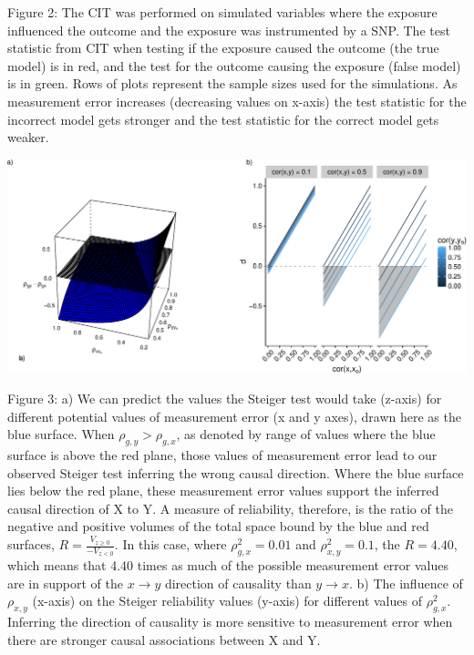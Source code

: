 \documentclass[]{article}
\begin{document}
Figure 2: The CIT was performed on simulated variables where the
exposure influenced the outcome and the exposure was instrumented by a
SNP. The test statistic from CIT when testing if the exposure caused the
outcome (the true model) is in red, and the test for the outcome causing
the exposure (false model) is in green. Rows of plots represent the
sample sizes used for the simulations. As measurement error increases
(decreasing values on x-axis) the test statistic for the incorrect model
gets stronger and the test statistic for the correct model gets weaker.

\newpage

\includegraphics{manuscript_files/figure-latex/steiger_sensitivity_plot-1.pdf}

Figure 3: a) We can predict the values the Steiger test would take
(z-axis) for different potential values of measurement error (x and y
axes), drawn here as the blue surface. When \(\rho_{g,y} > \rho_{g,x}\),
as denoted by range of values where the blue surface is above the red
plane, those values of measurement error lead to our observed Steiger
test inferring the wrong causal direction. Where the blue surface lies
below the red plane, these measurement error values support the inferred
causal direction of X to Y. A measure of reliability, therefore, is the
ratio of the negative and positive volumes of the total space bound by
the blue and red surfaces, \(R = \frac{V_{z \geq 0}}{ - V_{z < 0} }\).
In this case, where \(\rho_{g,x}^2 = 0.01\) and \(\rho_{x,y}^2 = 0.1\),
the \(R = 4.40\), which means that 4.40 times as much of the possible
measurement error values are in support of the \(x \rightarrow y\)
direction of causality than \(y \rightarrow x\). b) The influence of
\(\rho_{x,y}\) (x-axis) on the Steiger reliability values (y-axis) for
different values of \(\rho_{g,x}^2\). Inferring the direction of
causality is more sensitive to measurement error when there are stronger
causal associations between X and Y.
\end{document}
